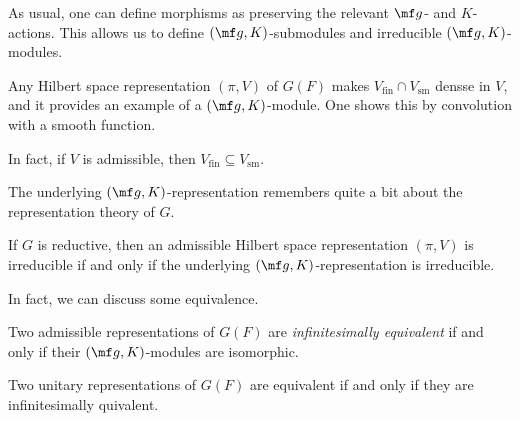 \documentclass{article}
\begin{document}
As usual, one can define morphisms as preserving the relevant $\mf g$- and $K$-actions. This allows us to define $(\mf g,K)$-submodules and irreducible $(\mf g,K)$-modules.
\begin{example}
	Any Hilbert space representation $(\pi,V)$ of $G(F)$ makes $V_{\mathrm{fin}}\cap V_{\mathrm{sm}}$ densse in $V$, and it provides an example of a $(\mf g,K)$-module. One shows this by convolution with a smooth function.
\end{example}
\begin{remark}
	In fact, if $V$ is admissible, then $V_{\mathrm{fin}}\subseteq V_{\mathrm{sm}}$.
\end{remark}
The underlying $(\mf g,K)$-representation remembers quite a bit about the representation theory of $G$.
\begin{theorem}
	If $G$ is reductive, then an admissible Hilbert space representation $(\pi,V)$ is irreducible if and only if the underlying $(\mf g,K)$-representation is irreducible.
\end{theorem}
In fact, we can discuss some equivalence.
\begin{definition}
	Two admissible representations of $G(F)$ are \textit{infinitesimally equivalent} if and only if their $(\mf g,K)$-modules are isomorphic.
\end{definition}
\begin{theorem}
	Two unitary representations of $G(F)$ are equivalent if and only if they are infinitesimally quivalent.
\end{theorem}
\end{document}
